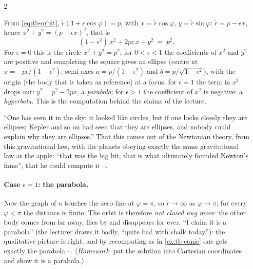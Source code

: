 \begin{paracol}{2}
\begin{example}\label{ex:tb-conic}
From \eqref{eq:tb-orbit}, $\tilde r(1+\epsilon\cos\varphi)=p$, with $x=\tilde r\cos\varphi$, $y=\tilde r\sin\varphi$: $\tilde r=p-\epsilon x$, hence $x^2+y^2=(p-\epsilon x)^2$, that is
\[
  (1-\epsilon^2)\,x^2+2p\epsilon\,x+y^2\;=\;p^2 .
\]
For $\epsilon=0$ this is the circle $x^2+y^2=p^2$; for $0<\epsilon<1$ the coefficients of $x^2$ and $y^2$ are positive and completing the square gives an ellipse (centre at $x=-p\epsilon/(1-\epsilon^2)$, semi-axes $a=p/(1-\epsilon^2)$ and $b=p/\sqrt{1-\epsilon^2}$), with the origin (the body that is taken as reference) at a focus; for $\epsilon=1$ the term in $x^2$ drops out: $y^2=p^2-2px$, a \emph{parabola}; for $\epsilon>1$ the coefficient of $x^2$ is negative: a \emph{hyperbola}. This is the computation behind the claims of the lecture.
\end{example}
\begin{coursenote}\label{cn:tb-kepler}
``One has seen it in the sky: it looked like circles, but if one looks closely they are ellipses; Kepler and so on had seen that they are ellipses, and nobody could explain why they are ellipses.'' That this comes out of the Newtonian theory, from this gravitational law, with the planets obeying exactly the same gravitational law as the apple: ``that was the big hit, that is what ultimately founded Newton's fame'', that he could compute it --.
\end{coursenote}

\paragraph{Case $\epsilon=1$: the parabola.} Now the graph of $u$ touches the zero line at $\varphi=\pi$, so $\tilde r\to\infty$ as $\varphi\to\pi$; for every $\varphi<\pi$ the distance is finite. The orbit is therefore \emph{not closed any more}: the other body comes from far away, flies by and disappears for ever. ``I claim it is a parabola'' (the lecturer draws it badly, ``quite bad with chalk today''): the qualitative picture is right, and by recomputing as in \cref{ex:tb-conic} one gets exactly the parabola --.
(\emph{Homework}: put the solution into Cartesian coordinates and show it is a parabola.)


\end{paracol}
